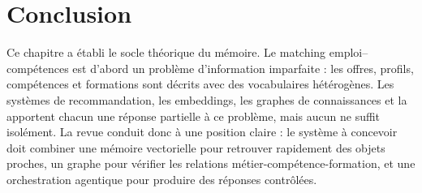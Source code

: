\section*{Conclusion}
Ce chapitre a établi le socle théorique du mémoire. Le matching emploi--compétences est d'abord un problème d'information imparfaite : les offres, profils, compétences et formations sont décrits avec des vocabulaires hétérogènes. Les systèmes de recommandation, les embeddings, les graphes de connaissances et la \RAG{} apportent chacun une réponse partielle à ce problème, mais aucun ne suffit isolément. La revue conduit donc à une position claire : le système à concevoir doit combiner une mémoire vectorielle pour retrouver rapidement des objets proches, un graphe pour vérifier les relations métier-compétence-formation, et une orchestration agentique pour produire des réponses contrôlées. 





